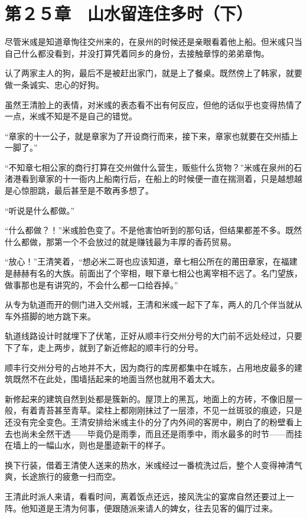 \section{第２５章　山水留连住多时（下）}

尽管米彧是知道章恂往交州来的，在泉州的时候还是亲眼看着他上船。但米彧只当自己什么都没看到，并没打算凭着同乡的身份，去接触章惇的弟弟章恂。

认了两家主人的狗，最后不是被赶出家门，就是上了餐桌。既然傍上了韩家，就要做一条诚实、忠心的好狗。

虽然王清脸上的表情，对米彧的表态看不出有何反应，但他的话似乎也变得热情了一点，米彧不知是不是自己的错觉。

“章家的十一公子，就是章家为了开设商行而来，接下来，章家也就要在交州插上一脚了。”

“不知章七相公家的商行打算在交州做什么营生，贩些什么货物？”米彧在泉州的石渚港看到章家的十一衙内上船南行后，在船上的时候便一直在揣测着，只是越想越是心惊胆跳，最后甚至是不敢再多想了。

“听说是什么都做。”

“什么都做？！”米彧脸色变了。不是他害怕听到的那句话，但结果都差不多。既然什么都做，那第一个不会放过的就是赚钱最为丰厚的香药贸易。

“放心！”王清笑着，“想必米二哥也应该知道，章七相公所在的莆田章家，在福建是赫赫有名的大族。前面出了个宰相，眼下章七相公也离宰相不远了。名门望族，做事那也是有讲究的，不会什么都一口给吞掉。”

从专为轨道而开的侧门进入交州城，王清和米彧一起下了车，两人的几个伴当就从车外搭脚的地方跳下来。

轨道线路设计时就埋下了伏笔，正好从顺丰行交州分号的大门前不远处经过，只要下了车，走上两步，就到了新近修起的顺丰行的分号。

顺丰行交州分号的占地并不大，因为商行的库房都集中在城东，占用地皮最多的建筑既然不在此处，围墙括起来的地面当然也就用不着太大。

新修起来的建筑自然到处都是簇新的。屋顶上的黑瓦，地面上的方砖，不像旧屋一般，有着青苔甚至青草。梁柱上都刚刚抹过了一层漆，不见一丝斑驳的痕迹，只是还没有完全变色。王清安排给米彧主仆的分了内外间的客房中，刷白了的粉壁看上去也尚未全然干透——毕竟仍是雨季，而且还是雨季中，雨水最多的时节——而挂在墙上的一幅山水，则也是墨迹新干的样子。

换下行装，借着王清使人送来的热水，米彧经过一番梳洗过后，整个人变得神清气爽，长途旅行的疲惫一扫而空。

王清此时派人来请，看看时间，离着饭点还远，接风洗尘的宴席自然还要过上一阵。他知道是王清为何事，便跟随派来请人的婢女，往去见客的偏厅过来。

